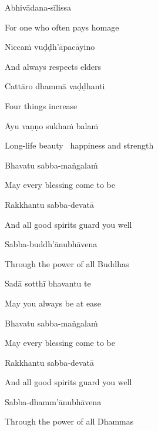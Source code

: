 Abhivādana-sīlissa

\begin{english}
  For one who often pays homage
\end{english}

Niccaṁ vuḍḍh'āpacāyino

\begin{english}
  And always respects elders
\end{english}

Cattāro dhammā vaḍḍhanti

\begin{english}
  Four things increase
\end{english}

Āyu vaṇṇo sukhaṁ balaṁ

\begin{english}
  Long-life beauty \breathmark\ happiness and strength
\end{english}

Bhavatu sabba-maṅgalaṁ

\begin{english}
  May every blessing come to be
\end{english}

Rakkhantu sabba-devatā

\begin{english}
  And all good spirits guard you well
\end{english}

Sabba-buddh'ānubhāvena

\begin{english}
  Through the power of all Buddhas
\end{english}

Sadā sotthī bhavantu te

\begin{english}
  May you always be at ease
\end{english}

Bhavatu sabba-maṅgalaṁ

\begin{english}
  May every blessing come to be
\end{english}

Rakkhantu sabba-devatā

\begin{english}
  And all good spirits guard you well
\end{english}

Sabba-dhamm'ānubhāvena

\begin{english}
  Through the power of all Dhammas
\end{english}

